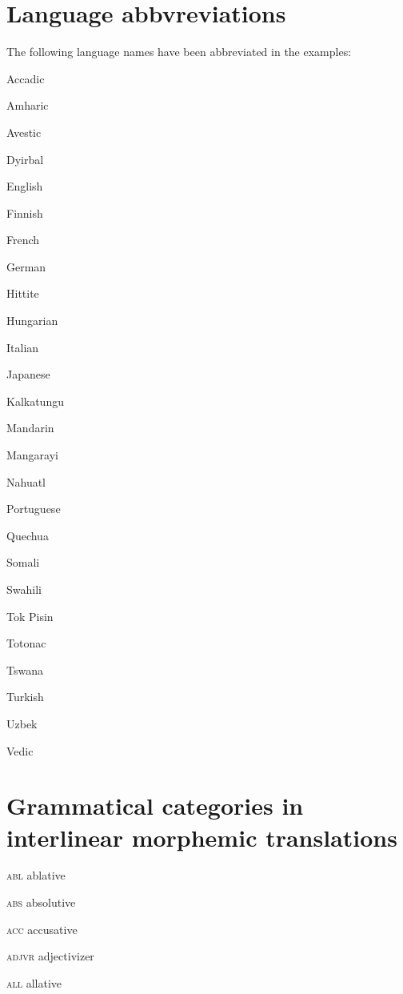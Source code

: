 \begin{refsection}

\section*{Language abbvreviations}

\noindent The following language names have been abbreviated in the examples:

\begin{multicols}{2}
	
	Accadic
	
	Amharic
	
	Avestic
	
	Dyirbal
	
	English
	
	Finnish
	
	French
	
	German
	
	Hittite
	
	Hungarian
	
	Italian
	
	Japanese
	
	Kalkatungu
	
	Mandarin
	
	Mangarayi
	
	Nahuatl
	
	Portuguese
	
	Quechua
	
	Somali
	
	Swahili
	
	Tok Pisin
	
	Totonac
	
	Tswana
	
	Turkish
	
	Uzbek
	
	Vedic
\end{multicols}

\section*{Grammatical categories in interlinear morphemic translations}

\begin{multicols}{2}
	\textsc{abl}  ablative
	
	\textsc{abs}  absolutive
	
	\textsc{acc}  accusative
	
	\textsc{adjvr}  adjectivizer
	
	\textsc{all}  allative
	

\end{multicols}
\end{refsection}

